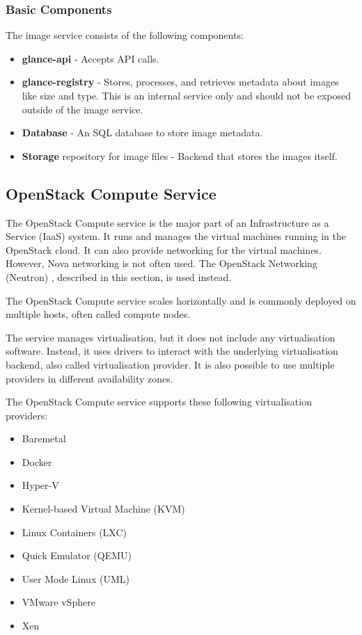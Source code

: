 \subsubsection*{Basic Components}
The image service consists of the following components:
\begin{itemize}
  \item{\textbf{glance-api} - Accepts API calls.}
  \item{\textbf{glance-registry} - Stores, processes, and retrieves metadata about images like size and type. This is an internal service only and should not be exposed outside of the image service.}
  \item{\textbf{Database} - An SQL database to store image metadata.}
  \item{\textbf{Storage} repository for image files - Backend that stores the images itself.}
\end{itemize}





\subsection{OpenStack Compute Service}
The OpenStack Compute service is the major part of an Infrastructure as a Service (IaaS) system. It runs and manages the virtual machines running in the OpenStack cloud. It can also provide networking for the virtual machines. However, Nova networking is not often used. The OpenStack Networking (Neutron) , described in this section, is used instead. \cite{InstallGuide}

The OpenStack Compute service scales horizontally and is commonly deployed on multiple hosts, \cite{OperationsGuide} often called compute nodes.

The service manages virtualisation, but it does not include any virtualisation software. Instead, it uses drivers to interact with the underlying virtualisation backend, also called virtualisation provider. It is also possible to use multiple providers in different availability zones.

The OpenStack Compute service supports these following virtualisation providers: \cite{AdminGuide}
\begin{itemize}
  \item{Baremetal}
  \item{Docker}
  \item{Hyper-V}
  \item{Kernel-based Virtual Machine (KVM)}
  \item{Linux Containers (LXC)}
  \item{Quick Emulator (QEMU)}
  \item{User Mode Linux (UML)}
  \item{VMware vSphere}
  \item{Xen}
\end{itemize}

